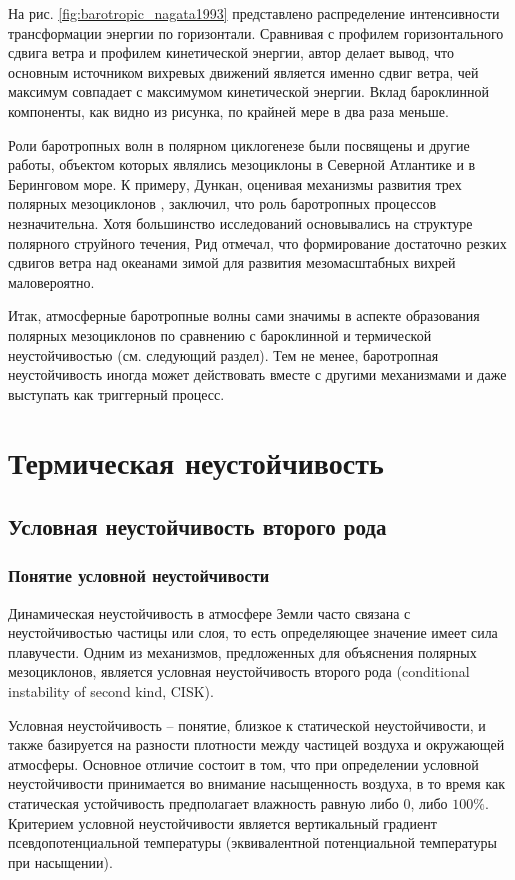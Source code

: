 \documentclass[12pt,a4paper]{report}
\begin{document}
На рис. \ref{fig:barotropic_nagata1993} представлено распределение интенсивности трансформации энергии по горизонтали. Сравнивая с профилем горизонтального сдвига ветра и профилем кинетической энергии, автор делает вывод, что основным источником вихревых движений является именно сдвиг ветра, чей максимум совпадает с максимумом кинетической энергии. Вклад бароклинной компоненты, как видно из рисунка, по крайней мере в два раза меньше.

Роли баротропных волн в полярном циклогенезе были посвящены и другие работы, объектом которых являлись мезоциклоны в Северной Атлантике и в Беринговом море. К примеру, Дункан, оценивая механизмы развития трех полярных мезоциклонов \citep{RT2003}, заключил, что роль баротропных процессов незначительна. Хотя большинство исследований основывались на структуре полярного струйного течения, Рид \citep{ReedDuncan1987} отмечал, что формирование достаточно резких сдвигов ветра над океанами зимой для развития мезомасштабных вихрей маловероятно.

Итак, атмосферные баротропные волны сами значимы в аспекте образования полярных мезоциклонов по сравнению с бароклинной и термической неустойчивостью (см. следующий раздел). Тем не менее, баротропная неустойчивость иногда может действовать вместе с другими механизмами и даже выступать как триггерный процесс.

\section{Термическая неустойчивость}
\subsection{Условная неустойчивость второго рода}
\subsubsection{Понятие условной неустойчивости}
Динамическая неустойчивость в атмосфере Земли часто связана с неустойчивостью частицы или слоя, то есть определяющее значение имеет сила плавучести. Одним из механизмов, предложенных для объяснения полярных мезоциклонов, является условная неустойчивость второго рода (conditional instability of second kind, CISK). 

Условная неустойчивость – понятие, близкое к статической неустойчивости, и также базируется на разности плотности между частицей воздуха и окружающей атмосферы. Основное отличие состоит в том, что при определении условной неустойчивости принимается во внимание насыщенность воздуха, в то время как статическая устойчивость предполагает влажность равную либо $0$, либо $100\%$. Критерием условной неустойчивости является вертикальный градиент псевдопотенциальной температуры (эквивалентной потенциальной температуры при насыщении).
\end{document}
